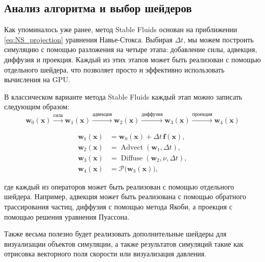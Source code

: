 \subsection{Анализ алгоритма и выбор шейдеров}
Как упоминалось уже ранее, метод Stable Fluids основан на приближении \eqref{eq:NS_projection} уравнения Навье-Стокса. Выбирая $\Delta t$, мы можем построить симуляцию с помощью разложения на четыре этапа: добавление силы, адвекция, диффузия и проекция. Каждый из этих этапов может быть реализован с помощью отдельного шейдера, что позволяет просто и эффективно использовать вычисления на GPU.

В классическом варианте метода Stable Fluids\cite{stamstablefluids} каждый этап можно записать следующим образом:
\begin{equation}\label{eq:stages_pipeline}
    \mathbf{w}_0(\mathbf{x})
    \xrightarrow{\text{сила}}
    \mathbf{w}_1(\mathbf{x})
    \xrightarrow{\text{адвекция}}
    \mathbf{w}_2(\mathbf{x})
    \xrightarrow{\text{диффузия}}
    \mathbf{w}_3(\mathbf{x})
    \xrightarrow{\text{проекция}}
    \mathbf{w}_4(\mathbf{x})
\end{equation}


\[
    \begin{aligned}
        \mathbf{w}_1(\mathbf{x}) & = \mathbf{w}_0(\mathbf{x}) + \Delta t\,\mathbf{f}(\mathbf{x}), \\
        \mathbf{w}_2(\mathbf{x}) & = \operatorname{Advect}(\mathbf{w}_1,\Delta t),                \\
        \mathbf{w}_3(\mathbf{x}) & = \operatorname{Diffuse}(\mathbf{w}_2,\nu,\Delta t),           \\
        \mathbf{w}_4(\mathbf{x}) & = \mathcal{P}\bigl(\mathbf{w}_3(\mathbf{x})\bigr),
    \end{aligned}
\]

где каждый из операторов может быть реализован с помощью отдельного шейдера. Например, адвекция может быть реализована с помощью обратного трассирования частиц, диффузия \textemdash{} с помощью метода Якоби, а проекция \textemdash{} с помощью решения уравнения Пуассона.

Также весьма полезно будет реализовать дополнительные шейдеры для визуализации объектов симуляции, а также результатов симуляций такие как отрисовка векторного поля скорости или визуализация давления.


